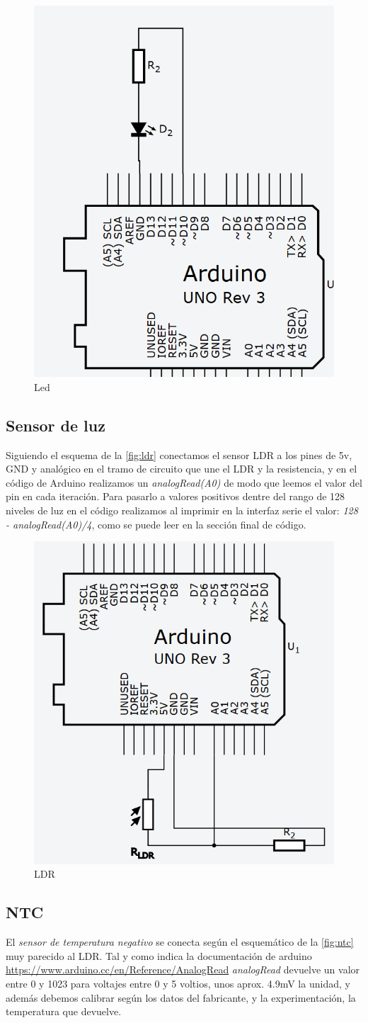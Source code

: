 \documentclass[]{article}
\begin{document}
\begin{figure}[H]
	\centering
	\includegraphics[width=0.4\linewidth]{images/led.PNG}
	\caption{Led}
	\label{fig:led}
\end{figure}

\subsection{Sensor de luz}

Siguiendo el esquema de la \autoref{fig:ldr} conectamos el sensor LDR a los pines de 5v, GND y analógico en el tramo de circuito que une el LDR y la resistencia, y en el código de Arduino realizamos un \textit{analogRead(A0)} de modo que leemos el valor del pin en cada iteración. Para pasarlo a valores positivos dentre del rango de 128 niveles de luz en el código realizamos al imprimir en la interfaz serie el valor: \textit{128 - analogRead(A0)/4}, como se puede leer en la sección final de código.

\begin{figure}[H]
	\centering
	\includegraphics[width=0.4\linewidth]{images/ldr.PNG}
	\caption{LDR}
	\label{fig:ldr}
\end{figure}

\subsection{NTC}
El \textit{sensor de temperatura negativo} se conecta según el esquemático de la \autoref{fig:ntc} muy parecido al LDR. Tal y como indica la documentación de arduino \url{https://www.arduino.cc/en/Reference/AnalogRead} \textit{analogRead} devuelve un valor entre 0 y 1023 para voltajes entre 0 y 5 voltios, unos aprox. 4.9mV la unidad, y además debemos calibrar según los datos del fabricante, y la experimentación, la temperatura que devuelve.
\end{document}
